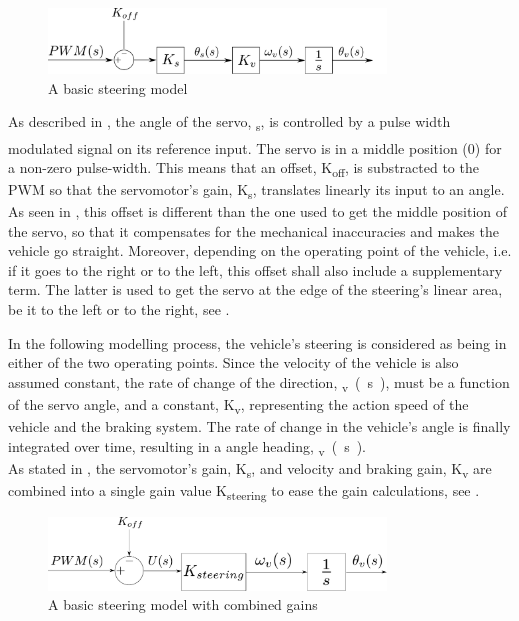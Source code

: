 \begin{figure}[H]
	\centering
	\includegraphics[width=0.8\textwidth]{figures/basicSteeringModel.pdf}
	\caption{A basic steering model}
	\label{basicSteering}
\end{figure}
 
As described in , the angle of the servo, \si{\theta_{s}}, is controlled by a pulse width modulated signal on its reference input. The servo is in a middle position (\si{0^{\circ}}) for a non-zero pulse-width.
This means that an offset, \si{K_{off}}, is substracted to the PWM so that the servomotor's gain, \si{K_s}, translates linearly its input to an angle. As seen in , this offset is different than the one used to get the middle position of the servo, so that it compensates for the mechanical inaccuracies and makes the vehicle go straight. Moreover, depending on the operating point of the vehicle, i.e. if it goes to the right or to the left, this offset shall also include a supplementary term. The latter is used to get the servo at the edge of the steering's linear area, be it to the left or to the right, see .

In the following modelling process, the vehicle's steering is considered as being in either of the two operating points. Since the velocity of the vehicle is also assumed constant, the rate of change of the direction, \si{\omega_{v} (s)}, must be a function of the servo angle, and a constant, \si{K_v}, representing the action speed of the vehicle and the braking system.
The rate of change in the vehicle's angle is finally integrated over time, resulting in a angle heading, \si{\theta_{v} (s)}.\\
%
As stated in , the servomotor's gain, \si{K_s}, and velocity and braking gain, \si{K_v} are combined into a single gain value \si{K_{steering}} to ease the gain calculations, see .

\begin{figure}[H]
  \centering
  \includegraphics[width=0.8\textwidth]{figures/basicSteeringModelKCombinated.pdf}
  \caption{A basic steering model with combined gains}
  \label{fig:basicSteeringModelKCombinated}
\end{figure}


